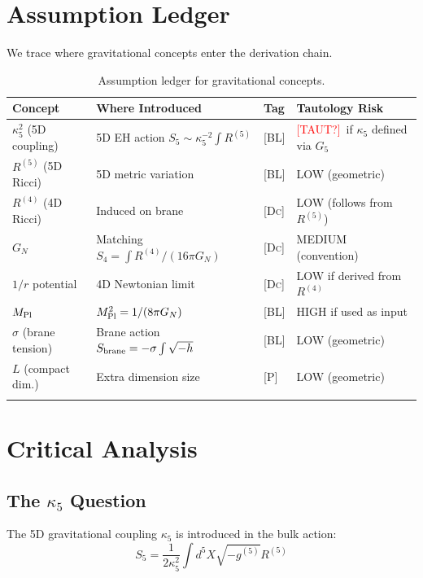 \documentclass[11pt,a4paper]{article}
\newcommand{\BL}{\textsc{[BL]}}
\newcommand{\Post}{\textsc{[P]}}
\newcommand{\Deriv}{\textsc{[Dc]}}
\newcommand{\Taut}{\textcolor{red}{\textsc{[TAUT?]}}}
\begin{document}
\section{Assumption Ledger}

We trace where gravitational concepts enter the derivation chain.

\begin{longtable}{p{3cm}p{4cm}p{2cm}p{4cm}}
\toprule
\textbf{Concept} & \textbf{Where Introduced} & \textbf{Tag} & \textbf{Tautology Risk} \\
\midrule
\endhead
$\kappa_5^2$ (5D coupling) & 5D EH action $S_5 \sim \kappa_5^{-2} \int R^{(5)}$ &
\BL & \Taut\ if $\kappa_5$ defined via $G_5$ \\
$R^{(5)}$ (5D Ricci) & 5D metric variation & \BL & LOW (geometric) \\
$R^{(4)}$ (4D Ricci) & Induced on brane & \Deriv & LOW (follows from $R^{(5)}$) \\
$G_N$ & Matching $S_4 = \int R^{(4)}/(16\pi G_N)$ & \Deriv & MEDIUM (convention) \\
$1/r$ potential & 4D Newtonian limit & \Deriv & LOW if derived from $R^{(4)}$ \\
$M_{\rm Pl}$ & $M_{\rm Pl}^2 = 1/(8\pi G_N)$ & \BL & HIGH if used as input \\
$\sigma$ (brane tension) & Brane action $S_{\rm brane} = -\sigma \int \sqrt{-h}$ &
\BL & LOW (geometric) \\
$L$ (compact dim.) & Extra dimension size & \Post & LOW (geometric) \\
\bottomrule
\caption{Assumption ledger for gravitational concepts.}
\label{tab:ledger}
\end{longtable}

\section{Critical Analysis}

\subsection{The $\kappa_5$ Question}

The 5D gravitational coupling $\kappa_5$ is introduced in the bulk action:
\[
S_5 = \frac{1}{2\kappa_5^2} \int d^5X \sqrt{-g^{(5)}} R^{(5)}
\]
\end{document}
